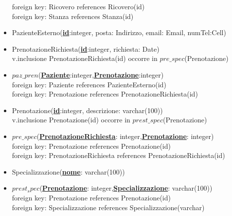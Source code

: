 \documentclass[12pt, letterpaper]{article}
\begin{document}
\begin{itemize}
    foreign key: Ricovero references Ricovero(id)\\
    foreign key: Stanza references Stanza(id)\\
    \item PazienteEsterno(\underline{\textbf{id}}:integer, posta: Indirizzo, email: Email, numTel:Cell)
    \item PrenotazioneRichiesta(\underline{\textbf{id}}:integer, richiesta: Date)\\
            v.inclusione PrenotazioneRichiesta(id) occorre in $pre\_spec$(Prenotazione)
    \item $paz\_pren$(\underline{\textbf{Paziente}}:integer,\underline{\textbf{Prenotazione}}:integer)\\
            foreign key: Paziente references PazienteEsterno(id)\\
            foreign key: Prenotazione references PrenotazioneRichiesta(id)\\
\newpage
    \item Prenotazione(\underline{\textbf{id}}:integer, descrizione: varchar(100))\\
    v.inclusione Prenotazione(id) occorre in $prest\_spec$(Prenotazione)
    \item $pre\_spec$(\underline{\textbf{PrenotazioneRichiesta}}: integer,\underline{\textbf{Prenotazione}}: integer)\\
    foreign key: Prenotazione references Prenotazione(id)\\
    foreign key: PrenotazioneRichiesta references PrenotazioneRichiesta(id)\\
    \item Specializzazione(\underline{\textbf{nome}}: varchar(100))
    \item $prest_spec$(\underline{\textbf{Prenotazione}}: integer,\underline{\textbf{Specializzazione}}: varchar(100))\\
    foreign key: Prenotazione references Prenotazione(id)\\
    foreign key: Specializzazione references Specializzazione(varchar)\\
    

\end{itemize}
\end{document}
